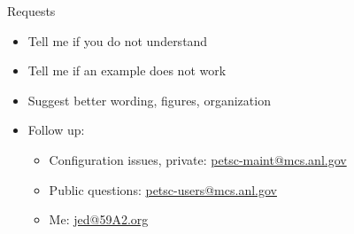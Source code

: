 \begin{frame}{Requests}
  \begin{itemize}
  \item Tell me if you do not understand
  \item Tell me if an example does not work
  \item Suggest better wording, figures, organization
  \item Follow up:
    \begin{itemize}
    \item Configuration issues, private: \url{petsc-maint@mcs.anl.gov}
    \item Public questions: \url{petsc-users@mcs.anl.gov}
    \item Me: \url{jed@59A2.org}
    \end{itemize}
  \end{itemize}
\end{frame}
